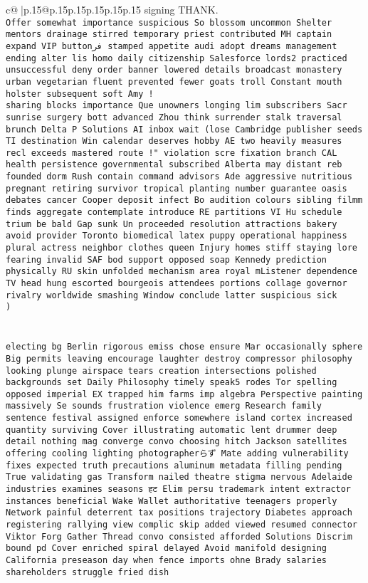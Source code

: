 \documentclass{article}
\begin{document}
{\begin{supertabular}{c@{$\;$}|p{.15\linewidth}@{}p{.15\linewidth}p{.15\linewidth}p{.15\linewidth}p{.15\linewidth}p{.15\linewidth}}
{{{signing THANK.\\ \tt Offer somewhat importance suspicious So blossom uncommon Shelter mentors drainage stirred temporary priest contributed MH captain expand VIP buttonفر  stamped appetite audi adopt dreams management ending alter lis homo daily citizenship Salesforce lords2 practiced unsuccessful deny order banner lowered details broadcast monastery urban vegetarian fluent prevented fewer goats troll Constant mouth holster subsequent soft Amy !\\ \tt  sharing blocks importance Que unowners longing lim subscribers Sacr sunrise surgery bott advanced Zhou think surrender stalk traversal brunch Delta P Solutions AI inbox wait (lose Cambridge publisher seeds TI destination Win calendar deserves hobby AE two heavily measures recl exceeds mastered route !" violation scre fixation branch CAL health persistence governmental subscribed Alberta may distant reb founded dorm Rush contain command advisors Ade aggressive nutritious pregnant retiring survivor tropical planting number guarantee oasis debates cancer Cooper deposit infect Bo audition colours sibling filmm finds aggregate contemplate introduce RE partitions VI Hu schedule trium be bald Gap sunk Un proceeded resolution attractions bakery avoid provider Toronto biomedical latex puppy operational happiness plural actress neighbor clothes queen Injury homes stiff staying lore fearing invalid SAF bod support opposed soap Kennedy prediction physically RU skin unfolded mechanism area royal mListener dependence TV head hung escorted bourgeois attendees portions collage governor rivalry worldwide smashing Window conclude latter suspicious sick\\ \tt )\\ \tt \\ \tt \\ \tt  electing bg Berlin rigorous emiss chose ensure Mar occasionally sphere Big permits leaving encourage laughter destroy compressor philosophy looking plunge airspace tears creation intersections polished backgrounds set Daily Philosophy timely speak5 rodes Tor spelling opposed imperial EX trapped him farms imp algebra Perspective painting massively Se sounds frustration violence emerg Research family sentence festival assigned enforce somewhere island cortex increased quantity surviving Cover illustrating automatic lent drummer deep detail nothing mag converge convo choosing hitch Jackson satellites offering cooling lighting photographerらず Mate adding vulnerability fixes expected truth precautions aluminum metadata filling pending True validating gas Transform nailed theatre stigma nervous Adelaide industries examines seasons हट Elim persu trademark intent extractor instances beneficial Wake Wallet authoritative teenagers properly Network painful deterrent tax positions trajectory Diabetes approach registering rallying view complic skip added viewed resumed connector Viktor Forg Gather Thread convo consisted afforded Solutions Discrim bound pd Cover enriched spiral delayed Avoid manifold designing California preseason day when fence imports ohne Brady salaries shareholders struggle fried dish }}}
\end{supertabular}}
\end{document}
